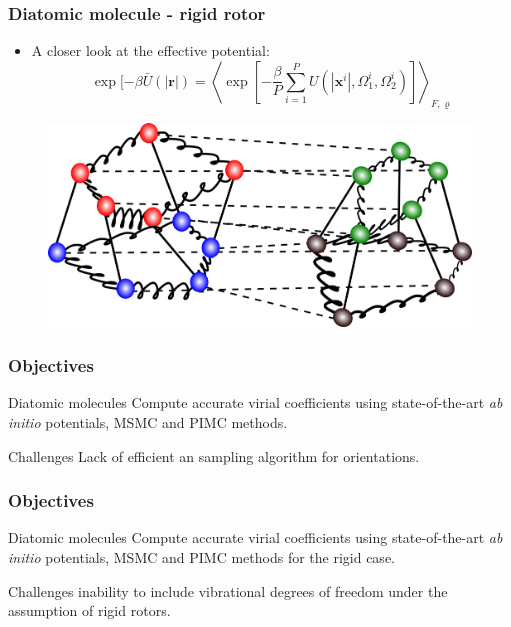 \documentclass[xcolor=svgnames]{beamer}
\DeclareRobustCommand{\abinitio}[0]{\emph{ab initio}}
\DeclareRobustCommand{\mbf}[1]{{\boldsymbol {#1}}}
\begin{document}
        \begin{frame}
            \frametitle{Diatomic molecule - rigid rotor}
            \begin{itemize}
                \justifying
                \item A closer look at the effective potential: 
                \begin{equation*}
                    \exp [-\beta \bar{U} (|\mbf{r}|) = \left< \exp \left[ -\frac{\beta}{P} \sum_{i=1}^P U (|\mbf{x}^i|,\Omega_1^i,\Omega_2^i) \right] \right>_{F,\varrho}
                \end{equation*}
            \end{itemize}
            \begin{figure}
            \centering
            \includegraphics[scale=0.3,keepaspectratio]{5beadsDimerVariableOrientation.png}
            \end{figure}

        \end{frame}
        \begin{frame}
            \frametitle{Objectives}
            \begin{block}{Diatomic molecules}
                Compute accurate virial coefficients using state-of-the-art \abinitio{} potentials, MSMC and PIMC methods.
            \end{block}
            \begin{alertblock}{Challenges}
                Lack of efficient an sampling algorithm for orientations.
            \end{alertblock}
        \end{frame}

        \begin{frame}
            \frametitle{Objectives}
            \begin{block}{Diatomic molecules}
                Compute accurate virial coefficients using state-of-the-art \abinitio{} potentials, MSMC and PIMC methods for the rigid case.
            \end{block}
                \begin{alertblock}{Challenges}
                    inability to include vibrational degrees of freedom under the assumption of rigid rotors.
                \end{alertblock}
        \end{frame}
\end{document}
